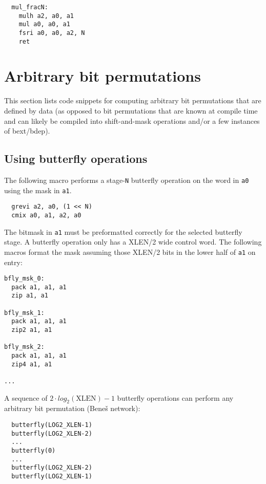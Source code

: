 \begin{minipage}{\linewidth}
\begin{verbatim}
  mul_fracN:
    mulh a2, a0, a1
    mul a0, a0, a1
    fsri a0, a0, a2, N
    ret
\end{verbatim}
\end{minipage}


\section{Arbitrary bit permutations}

This section lists code snippets for computing arbitrary bit permutations that
are defined by data (as opposed to bit permutations that are known at compile
time and can likely be compiled into shift-and-mask operations and/or a few
instances of bext/bdep).

\subsection{Using butterfly operations}
\label{butterfly}

The following macro performs a stage-{\tt N} butterfly operation on the word in
{\tt a0} using the mask in {\tt a1}.

\begin{verbatim}
  grevi a2, a0, (1 << N)
  cmix a0, a1, a2, a0
\end{verbatim}

The bitmask in {\tt a1} must be preformatted correctly for the selected butterfly
stage. A butterfly operation only has a XLEN/2 wide control word. The following
macros format the mask assuming those XLEN/2 bits in the lower half of {\tt a1}
on entry:

\begin{verbatim}
bfly_msk_0:
  pack a1, a1, a1
  zip a1, a1

bfly_msk_1:
  pack a1, a1, a1
  zip2 a1, a1

bfly_msk_2:
  pack a1, a1, a1
  zip4 a1, a1

...
\end{verbatim}

A sequence of $2\cdot{}log_2(\textrm{XLEN})-1$ butterfly operations can perform any
arbitrary bit permutation (Bene{\v s} network):

\begin{verbatim}
  butterfly(LOG2_XLEN-1)
  butterfly(LOG2_XLEN-2)
  ...
  butterfly(0)
  ...
  butterfly(LOG2_XLEN-2)
  butterfly(LOG2_XLEN-1)
\end{verbatim}


